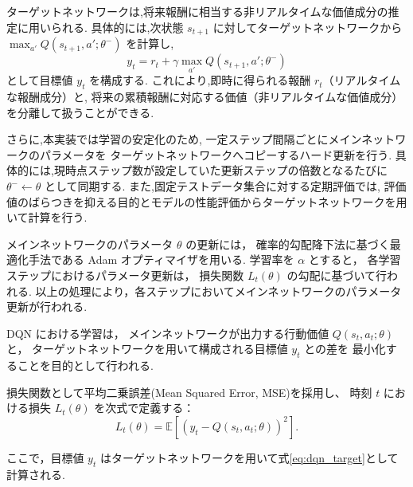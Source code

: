 \documentclass{jarticle}
\begin{document}
ターゲットネットワークは,将来報酬に相当する非リアルタイムな価値成分の推定に用いられる.
具体的には,次状態 $s_{t+1}$ に対してターゲットネットワークから
$\max_{a'}Q(s_{t+1},a';\theta^{-})$ を計算し,
\begin{equation}
y_t =
r_t + \gamma \max_{a'} Q(s_{t+1},a';\theta^{-})
\label{eq:dqn_target}
\end{equation}
として目標値 $y_t$ を構成する.
これにより,即時に得られる報酬 $r_t$（リアルタイムな報酬成分）と,
将来の累積報酬に対応する価値（非リアルタイムな価値成分）を分離して扱うことができる.

さらに,本実装では学習の安定化のため,
一定ステップ間隔ごとにメインネットワークのパラメータを
ターゲットネットワークへコピーするハード更新を行う.
具体的には,現時点ステップ数が設定していた更新ステップの倍数となるたびに
$\theta^{-}\leftarrow\theta$ として同期する.
また,固定テストデータ集合に対する定期評価では,
評価値のばらつきを抑える目的とモデルの性能評価からターゲットネットワークを用いて計算を行う.

メインネットワークのパラメータ $\theta$ の更新には，
確率的勾配降下法に基づく最適化手法である Adam オプティマイザを用いる.
学習率を $\alpha$ とすると，
各学習ステップにおけるパラメータ更新は，
損失関数 $L_t(\theta)$ の勾配に基づいて行われる.
以上の処理により，各ステップにおいてメインネットワークのパラメータ更新が行われる.

DQN における学習は，
メインネットワークが出力する行動価値 $Q(s_t,a_t;\theta)$ と，
ターゲットネットワークを用いて構成される目標値 $y_t$ との差を
最小化することを目的として行われる.

損失関数として平均二乗誤差(Mean Squared Error, MSE)を採用し、
時刻 $t$ における損失 $L_t(\theta)$ を次式で定義する：
\begin{equation}
L_t(\theta)
=
\mathbb{E}
\left[
\left(
y_t - Q(s_t,a_t;\theta)
\right)^2
\right].
\label{eq:dqn_loss}
\end{equation}

ここで，目標値 $y_t$ はターゲットネットワークを用いて式\ref{eq:dqn_target}として計算される.
\end{document}
